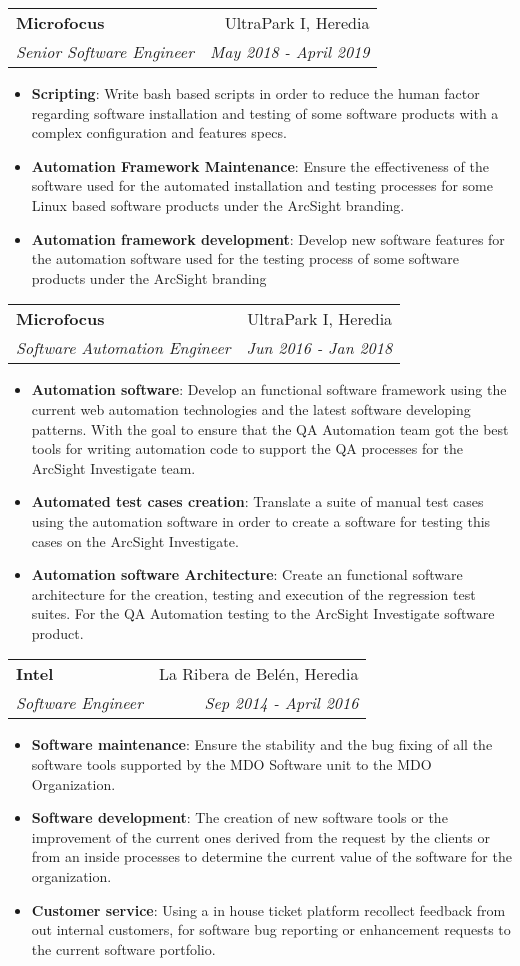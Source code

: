 \documentclass[letterpaper,11pt]{article}
\makeatletter
\newcommand{\resumeItem}[2]{
		  \item\small{
		    \textbf{#1}{: #2 \vspace{-2pt}}
		  }
		}
\newcommand{\resumeSubheading}[4]{
		  \vspace{-1pt}\item
		    \begin{tabular*}{0.97\textwidth}[t]{l@{\extracolsep{\fill}}r}
		      \textbf{#1} & #2 \\
		      \textit{\small#3} & \textit{\small #4} \\
		    \end{tabular*}\vspace{-5pt}
		}
\newcommand{\resumeItemListStart}{\begin{itemize}}
\newcommand{\resumeItemListEnd}{\end{itemize}\vspace{-5pt}}
\makeatother
\begin{document}
		    \resumeSubheading
		      {Microfocus}{UltraPark I, Heredia}
		      {Senior Software Engineer}{May 2018 - April 2019}
		      \resumeItemListStart
		        \resumeItem{Scripting}
		          {Write bash based scripts in order to reduce the human factor regarding software installation and testing of some software products with a complex configuration and features specs.}
		        \resumeItem{Automation Framework Maintenance}
		          {Ensure the effectiveness of the software used for the automated installation and testing processes  for some Linux based software products under the ArcSight branding.}
		          
		         \resumeItem{Automation framework development}
		          {Develop new software features for the automation software   used for the testing process of some software products under the ArcSight branding}
		          
		      \resumeItemListEnd
		
		    \resumeSubheading
		   {Microfocus}{UltraPark I, Heredia}
		   {Software Automation Engineer}{Jun 2016 - Jan 2018}
		     \resumeItemListStart
		       \resumeItem{Automation software}
		          {Develop an functional software framework using the current web automation technologies and the latest software developing patterns. With the goal to ensure that the QA Automation team got the best tools for writing automation code to support the QA processes for the ArcSight Investigate team.}
		        \resumeItem{Automated test cases creation}
		         {Translate a suite of manual test cases using the automation software in order to create a software for testing this cases on the ArcSight Investigate.}
		        \resumeItem{Automation software Architecture} 
	            {Create an functional software architecture for the creation, testing and execution of the regression test suites. For the QA Automation testing to the  ArcSight Investigate software product.}	         
		      \resumeItemListEnd
		
		    \resumeSubheading
		      {Intel}{La Ribera de Belén, Heredia}
		      {Software Engineer}{Sep 2014 - April 2016}
		      \resumeItemListStart
		        \resumeItem{Software maintenance}
		          {Ensure the stability and the bug fixing of all the software tools supported by the MDO Software unit to the MDO Organization.}
		        \resumeItem{Software development}
		          {The creation of new software tools or the improvement of the current ones derived from the request by the clients or from an inside processes to determine the current value of the software for the organization.}
		        \resumeItem{Customer service}
		          {Using a in house ticket platform recollect feedback from out internal customers, for software bug reporting or enhancement requests to the current software portfolio.}
		      \resumeItemListEnd
			
\end{document}
